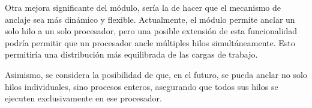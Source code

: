 Otra mejora significante del módulo, sería la de hacer que el mecanismo de anclaje sea más dinámico y flexible. Actualmente, el módulo permite anclar un solo hilo a un solo procesador, pero una posible extensión de esta funcionalidad podría permitir que un procesador ancle múltiples hilos simultáneamente. Esto permitiría una distribución más equilibrada de las cargas de trabajo.

Asimismo, se considera la posibilidad de que, en el futuro, se pueda anclar no solo hilos individuales, sino procesos enteros, asegurando que todos sus hilos se ejecuten exclusivamente en ese procesador.